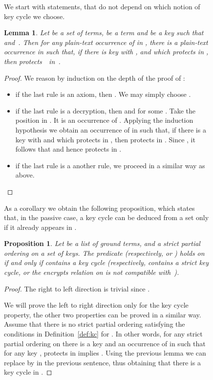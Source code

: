 \documentclass[acmtocl,acmnow]{acmtrans2m}
\newtheorem{proposition}[theorem]{Proposition}
\newtheorem{lemma}[theorem]{Lemma}
\begin{document}
\begin{figure}[t]
{{We start with statements, that do not depend on which notion of key cycle
we choose.

\begin{lemma}\label{lem:protects_deduc2}
Let  be a set of terms,  be a term and  be 
a key such that  and~. Then for
any plain-text occurrence  of  in , there is a plain-text occurrence  in  such that,
if there is key  with , and
which protects  in , then  protects~~in~.
\end{lemma}
\begin{proof}
We reason by induction on the depth of the proof of :\begin{itemize}
 \item if the last rule is an axiom, then  . We may simply
choose .\item if the last rule is a decryption, 
then  and  for some .
Take the position  in . It is an occurrence of . Applying the induction
hypothesis we obtain an occurrence  of  in  such that, if there is a key
 with  and
which protects  in , then
 protects  in  . Since , it
follows that  and hence  protects  in .
\item if the last rule is a another rule, we  proceed in a similar
way as above.
\end{itemize}
\end{proof}

As a corollary we obtain the following proposition, which
 states that, in the passive case, a key cycle can be
deduced from a set  only if it already appears in .
\begin{proposition}\label{prop:prop_deduc}
Let  be a list of ground terms, and  a strict partial ordering on a set of keys. The
predicate   (respectively,  or ) holds on
 if and only if  contains a key cycle (respectively,  contains a strict key cycle, or
the encrypts relation on  is not compatible with~). 
\end{proposition}
\begin{proof}
The right to left direction is trivial since .

We will prove the left to right direction only for the key cycle property,
 the other two properties can be proved in a similar way. Assume that there is no strict partial ordering satisfying the conditions in
Definition~\ref{def:kc} for . In other words, for any strict partial ordering 
on  there is a key  and an occurrence  of  in  such
that for any key ,   protects  in  implies . Using the
previous lemma we can replace  by  in the previous sentence, thus
obtaining that there is a key cycle in .
\end{proof}








}}
\end{figure}
\end{document}
